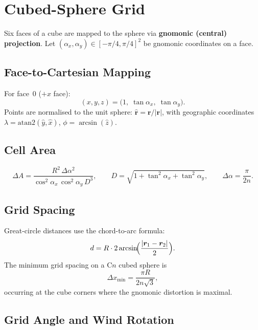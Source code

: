 \documentclass[11pt,twoside]{report}
\newcommand{\vect}[1]{\bm{#1}}
\begin{document}
\section{Cubed-Sphere Grid}
\label{sec:cubed-sphere}

Six faces of a cube are mapped to the sphere via \textbf{gnomonic (central)
projection}.  Let $(\alpha_x,\alpha_y)\in[-\pi/4,\pi/4]^2$ be gnomonic
coordinates on a face.

\subsection{Face-to-Cartesian Mapping}

For face~0 ($+x$ face):
\begin{equation}
  (x,y,z) = \bigl(1,\;\tan\alpha_x,\;\tan\alpha_y\bigr).
\end{equation}
Points are normalised to the unit sphere: $\hat{\vect{r}}=\vect{r}/|\vect{r}|$,
with geographic coordinates $\lambda=\mathrm{atan2}(\hat y,\hat x)$,
$\phi=\arcsin(\hat z)$.

\subsection{Cell Area}
\begin{equation}
  \Delta A = \frac{R^2\,\Delta\alpha^2}
    {\cos^2\!\alpha_x\,\cos^2\!\alpha_y\,D^3},
  \qquad D = \sqrt{1+\tan^2\!\alpha_x+\tan^2\!\alpha_y},
  \qquad \Delta\alpha=\frac{\pi}{2n}.
\end{equation}

\subsection{Grid Spacing}

Great-circle distances use the chord-to-arc formula:
\begin{equation}
  d = R\cdot 2\arcsin\!\Bigl(\frac{|\vect{r}_1-\vect{r}_2|}{2}\Bigr).
\end{equation}
The minimum grid spacing on a C$n$ cubed sphere is
\begin{equation}
  \Delta x_{\min} = \frac{\pi R}{2n\sqrt{3}},
\end{equation}
occurring at the cube corners where the gnomonic distortion is maximal.

\subsection{Grid Angle and Wind Rotation}
\end{document}
